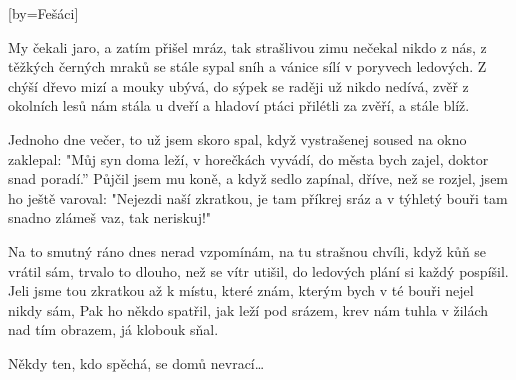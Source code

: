 [by={Fešáci}]

\beginverse{}
My čekali jaro, a zatím přišel mráz,
tak strašlivou zimu nečekal nikdo z nás,
z těžkých černých mraků se stále sypal sníh
a vánice sílí v poryvech ledových.
Z chýší dřevo mizí a mouky ubývá,
do sýpek se raději už nikdo nedívá,
zvěř z okolních lesů nám stála u dveří
a hladoví ptáci přilétli za zvěří, a stále blíž.
\endverse{}

\beginverse{}
\chordsoff{}
Jednoho dne večer, to už jsem skoro spal,
když vystrašenej soused na okno zaklepal:
"Můj syn doma leží, v horečkách vyvádí,
do města bych zajel, doktor snad poradí.”
Půjčil jsem mu koně, a když sedlo zapínal,
dříve, než se rozjel, jsem ho ještě varoval:
"Nejezdi naší zkratkou, je tam příkrej sráz
a v týhletý bouři tam snadno zlámeš vaz, tak neriskuj!"
\chordson{}
\endverse{}

\beginverse{}
\chordsoff{}
Na to smutný ráno dnes nerad vzpomínám,
na tu strašnou chvíli, když kůň se vrátil sám,
trvalo to dlouho, než se vítr utišil,
do ledových plání si každý pospíšil.
Jeli jsme tou zkratkou až k místu, které znám,
kterým bych v té bouři nejel nikdy sám,
Pak ho někdo spatřil, jak leží pod srázem,
krev nám tuhla v žilách nad tím obrazem, já klobouk sňal.
\chordson{}
\endverse{}

\beginverse*{}
Někdy ten, kdo spěchá, se domů nevrací\ldots{} 
\endverse{}

\endsong{}
